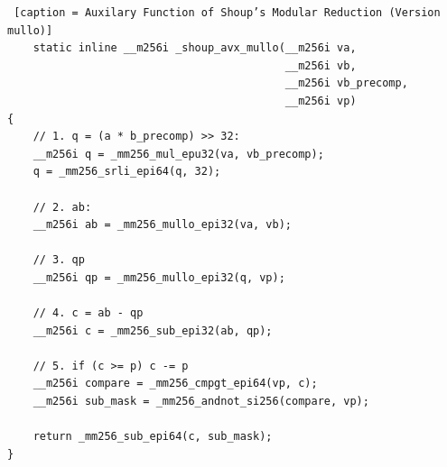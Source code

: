 \documentclass{article}
\begin{document}
\begin{lstlisting} [caption = Auxilary Function of Shoup’s Modular Reduction (Version mullo)]
    static inline __m256i _shoup_avx_mullo(__m256i va, 
                                           __m256i vb, 
                                           __m256i vb_precomp, 
                                           __m256i vp)
{
    // 1. q = (a * b_precomp) >> 32:
    __m256i q = _mm256_mul_epu32(va, vb_precomp);
    q = _mm256_srli_epi64(q, 32);

    // 2. ab:
    __m256i ab = _mm256_mullo_epi32(va, vb);

    // 3. qp
    __m256i qp = _mm256_mullo_epi32(q, vp);

    // 4. c = ab - qp
    __m256i c = _mm256_sub_epi32(ab, qp);

    // 5. if (c >= p) c -= p
    __m256i compare = _mm256_cmpgt_epi64(vp, c);
    __m256i sub_mask = _mm256_andnot_si256(compare, vp);

    return _mm256_sub_epi64(c, sub_mask);
}
\end{lstlisting}
\end{document}

